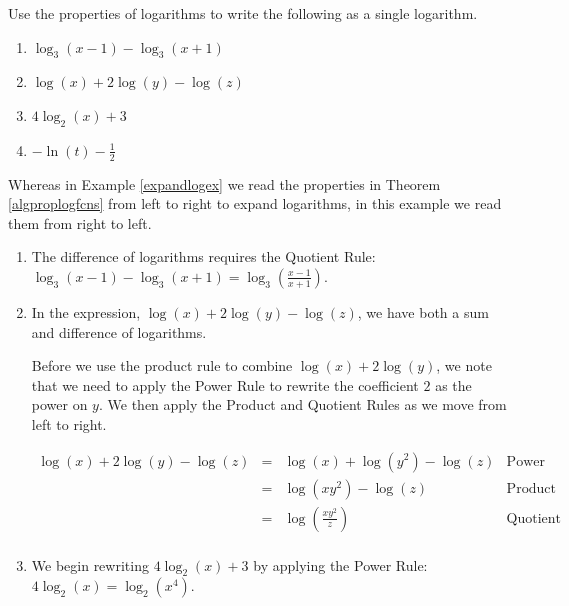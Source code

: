 \documentclass{ximera}
\begin{document}
\begin{example}  \label{contractlogex} Use the properties of logarithms to write the following as a single logarithm.

\begin{enumerate}

\item  $\log_{3}(x-1) - \log_{3}(x+1)$

\item  $\log(x) + 2\log(y) - \log(z)$

\item  $4\log_{2}(x) + 3$

\item  $-\ln(t) - \frac{1}{2}$

\end{enumerate}


\begin{explanation} Whereas in Example \ref{expandlogex} we read the properties in Theorem \ref{algproplogfcns} from left to right to expand logarithms, in this example we read them from right to left.

\begin{enumerate}

\item The difference of logarithms requires the Quotient Rule: $\log_{3}(x-1) - \log_{3}(x+1) = \log_{3}\left(\frac{x-1}{x+1}\right)$.

\item  In the expression, $\log(x) + 2\log(y) - \log(z)$, we have both a sum and difference of logarithms.  

Before we use the product rule to combine $\log(x) + 2\log(y)$, we note that we need to apply the Power Rule to rewrite the coefficient $2$ as the power on $y$.  We  then apply the Product and Quotient Rules as we move from left to right.

\[ \begin{array}{rclr}

\log(x) + 2\log(y) - \log(z) & = & \log(x) + \log\left(y^2\right) - \log(z) & \text{Power Rule} \\   
 & = & \log\left(xy^2\right) - \log(z) & \text{Product Rule} \\  
 & = & \log\left( \frac{xy^2}{z}\right) & \text{Quotient Rule} \\
\end{array}\]


\item  We begin rewriting $4\log_{2}(x) + 3$ by applying the Power Rule:  $4\log_{2}(x) = \log_{2}\left(x^4\right)$.


\end{enumerate}
\end{explanation}
\end{example}
\end{document}
